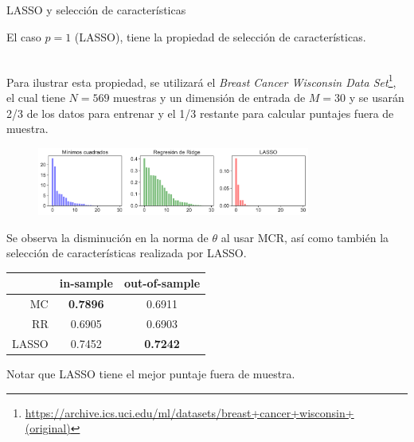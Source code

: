 \documentclass[handout, 9pt]{beamer}
\begin{document}
\begin{frame}{LASSO y selección de características}

El caso $p=1$ (LASSO), tiene la propiedad de selección de características.\\~\ \pause

Para ilustrar esta propiedad, se utilizará el \emph{Breast Cancer Wisconsin Data Set}\footnote{\url{https://archive.ics.uci.edu/ml/datasets/breast+cancer+wisconsin+(original)}}, el cual tiene $N=569$ muestras y un dimensión de entrada de $M=30$ y se usarán 2/3 de los datos para entrenar y el 1/3 restante para calcular puntajes fuera de muestra. \\

\begin{figure}[H]
	\centering
	\includegraphics[width=0.8\textwidth]{../../img/cap2_OLS_RR_LASSO.pdf}
\end{figure} \pause

Se observa la disminución en la norma de $\theta$ al usar MCR, así como también la selección de características realizada por LASSO.\pause

\begin{table}[h]
\centering
\footnotesize
	\begin{tabular}{ r|c|c } 
		 & in-sample & out-of-sample \\
		\hline
		MC & \textbf{0.7896} & 0.6911 \\ 
		RR & 0.6905 & 0.6903 \\ 
		LASSO & 0.7452 & \textbf{0.7242}
	\end{tabular}
\end{table}

 Notar que LASSO tiene el mejor puntaje fuera de muestra.

\end{frame}
\end{document}
